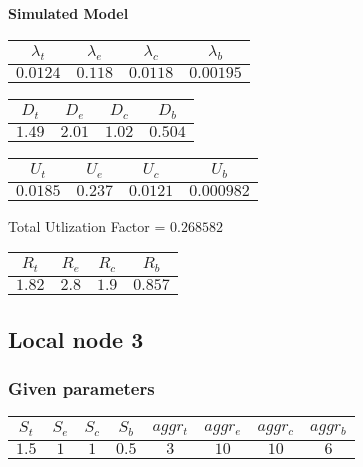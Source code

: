\documentclass{article}
\begin{document}
\begin{minipage}{0.5\textwidth}
\centering	\textbf{Simulated Model}
\begin{table}[H]
\centering
\begin{tabular}{@{}cccc@{}}
\toprule
$\lambda_t$ & $\lambda_e$ & $\lambda_c$ & $\lambda_b$\\
\midrule
$0.0124$ & $0.118$ & $0.0118$ & $0.00195$\\
\bottomrule
\end{tabular}
\end{table}
\begin{table}[H]
\centering
\begin{tabular}{@{}cccc@{}}
\toprule
$D_t$ & $D_e$ & $D_c$ & $D_b$\\
\midrule
$1.49$ & $2.01$ & $1.02$ & $0.504$\\
\bottomrule
\end{tabular}
\end{table}\begin{table}[H]
\centering
\begin{tabular}{@{}cccc@{}}
\toprule
$U_t$ & $U_e$ & $U_c$ & $U_b$\\
\midrule
$0.0185$ & $0.237$ & $0.0121$ & $0.000982$\\
\bottomrule
\end{tabular}
\end{table}
\centering Total Utlization Factor = $0.268582$
\begin{table}[H]
\centering
\begin{tabular}{@{}cccc@{}}
\toprule
$R_t$ & $R_e$ & $R_c$ & $R_b$\\
\midrule
$1.82$ & $2.8$ & $1.9$ & $0.857$\\
\bottomrule
\end{tabular}
\end{table}
\end{minipage}
\newpage\subsection{Local node 3}
\subsubsection{Given parameters}
\begin{table}[H]
\centering
\begin{tabular}{@{}cccc|cccc@{}}
\toprule
$S_t$ & $S_e$ & $S_c$ & $S_b$ & $aggr_t$ & $aggr_e$ & $aggr_c$ & $aggr_b$\\
\midrule
$1.5$ & $1$ & $1$ & $0.5$ & $3$ & $10$ & $10$ & $6$\\
\bottomrule
\end{tabular}
\end{table}
\end{document}
